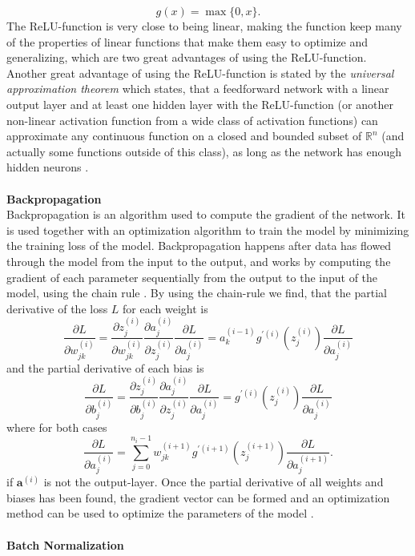 \documentclass[./main.tex]{subfiles}
\begin{document}
$$g(x) = \max\{0, x\}.$$
The ReLU-function is very close to being linear, making the function keep many of the properties of linear functions that make them easy to optimize and generalizing, which are two great advantages of using the ReLU-function. Another great advantage of using the ReLU-function is stated by the \textit{universal approximation theorem} which states, that a feedforward network with a linear output layer and at least one hidden layer with the ReLU-function (or another non-linear activation function from a wide class of activation functions) can approximate any continuous function on a closed and bounded subset of $\mathbb{R}^n$ (and actually some functions outside of this class), as long as the network has enough hidden neurons \cite{DeepLearning}. 
\\
\\
\noindent \textbf{Backpropagation} \\
Backpropagation is an algorithm used to compute the gradient of the network. It is used together with an optimization algorithm to train the model by minimizing the training loss of the model. Backpropagation happens after data has flowed through the model from the input to the output, and works by computing the gradient of each parameter sequentially from the output to the input of the model, using the chain rule \cite{DeepLearning}. By using the chain-rule we find, that the partial derivative of the loss $L$ for each weight is
$$\frac{\partial L}{\partial w_{jk} ^{(i)}} = \frac{\partial z_j ^{(i)}}{\partial w_{jk} ^{(i)}} \frac{\partial a_j ^{(i)}}{\partial z_j ^{(i)}} \frac{\partial L}{\partial a_j ^{(i)}} = a_k ^{(i - 1)} g ^{\prime (i)} \left( z_j ^{(i)} \right) \frac{\partial L}{\partial a_j ^{(i)}}$$
and the partial derivative of each bias is
$$\frac{\partial L}{\partial b^{(i)} _j} = \frac{\partial z^{(i)} _j}{\partial b^{(i)} _j} \frac{\partial a_j ^{(i)}}{\partial z^{(i)} _j} \frac{\partial L}{\partial a_j ^{(i)}} = g^{\prime (i)} \left( z_j ^{(i)} \right) \frac{\partial L}{\partial a_j ^{(i)}}$$
where for both cases
$$ \frac{\partial L}{\partial a_j ^{(i)}} = \sum_{j = 0} ^{n_i - 1} w_{jk} ^{(i + 1)} g^{\prime (i + 1)} \left( z_j ^{(i + 1)} \right) \frac{\partial L}{\partial a_j ^{(i + 1)}}.$$
if $\bm{a}^{(i)}$ is not the output-layer. Once the partial derivative of all weights and biases has been found, the gradient vector can be formed and an optimization method can be used to optimize the parameters of the model \cite{3b1b_4}.
\\
\\
\textbf{Batch Normalization} \\
\end{document}
